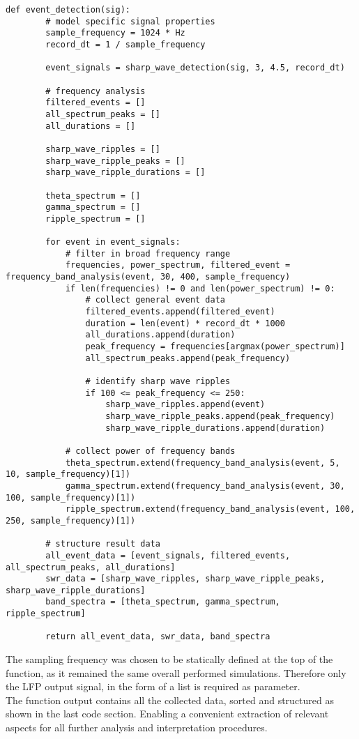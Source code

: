    \begin{lstlisting}[caption={Event Detection Function}]
    def event_detection(sig):
        # model specific signal properties
        sample_frequency = 1024 * Hz
        record_dt = 1 / sample_frequency
    
        event_signals = sharp_wave_detection(sig, 3, 4.5, record_dt)
    
        # frequency analysis
        filtered_events = []
        all_spectrum_peaks = []
        all_durations = []
    
        sharp_wave_ripples = []
        sharp_wave_ripple_peaks = []
        sharp_wave_ripple_durations = []
    
        theta_spectrum = []
        gamma_spectrum = []
        ripple_spectrum = []
    
        for event in event_signals:
            # filter in broad frequency range
            frequencies, power_spectrum, filtered_event = frequency_band_analysis(event, 30, 400, sample_frequency)
            if len(frequencies) != 0 and len(power_spectrum) != 0:
                # collect general event data
                filtered_events.append(filtered_event)
                duration = len(event) * record_dt * 1000
                all_durations.append(duration)
                peak_frequency = frequencies[argmax(power_spectrum)]
                all_spectrum_peaks.append(peak_frequency)
    
                # identify sharp wave ripples
                if 100 <= peak_frequency <= 250:
                    sharp_wave_ripples.append(event)
                    sharp_wave_ripple_peaks.append(peak_frequency)
                    sharp_wave_ripple_durations.append(duration)
    
            # collect power of frequency bands
            theta_spectrum.extend(frequency_band_analysis(event, 5, 10, sample_frequency)[1])
            gamma_spectrum.extend(frequency_band_analysis(event, 30, 100, sample_frequency)[1])
            ripple_spectrum.extend(frequency_band_analysis(event, 100, 250, sample_frequency)[1])
    
        # structure result data
        all_event_data = [event_signals, filtered_events, all_spectrum_peaks, all_durations]
        swr_data = [sharp_wave_ripples, sharp_wave_ripple_peaks, sharp_wave_ripple_durations]
        band_spectra = [theta_spectrum, gamma_spectrum, ripple_spectrum]
    
        return all_event_data, swr_data, band_spectra
    \end{lstlisting}
    The sampling frequency was chosen to be statically defined at the top of the function, as it remained the same overall performed simulations. Therefore only the LFP output signal, in the form of a list is required as parameter.\\
    The function output contains all the collected data, sorted and structured as shown in the last code section. Enabling a convenient extraction of relevant aspects for all further analysis and interpretation procedures. 
    
